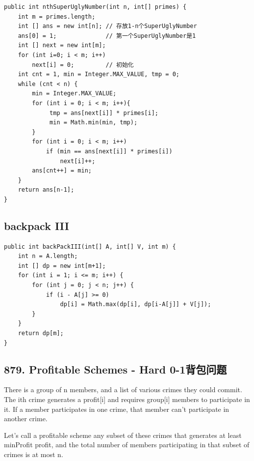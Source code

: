 \documentclass[9pt, b5paaper]{book}
\begin{document}
\begin{verbatim}
public int nthSuperUglyNumber(int n, int[] primes) {
    int m = primes.length;
    int [] ans = new int[n]; // 存放1-n个SuperUglyNumber
    ans[0] = 1;              // 第一个SuperUglyNumber是1
    int [] next = new int[m];
    for (int i=0; i < m; i++)
        next[i] = 0;         // 初始化
    int cnt = 1, min = Integer.MAX_VALUE, tmp = 0;
    while (cnt < n) {
        min = Integer.MAX_VALUE;
        for (int i = 0; i < m; i++){
             tmp = ans[next[i]] * primes[i];
             min = Math.min(min, tmp);
        }
        for (int i = 0; i < m; i++)
            if (min == ans[next[i]] * primes[i])
                next[i]++;
        ans[cnt++] = min;			
    }
    return ans[n-1];		
}
\end{verbatim}

\subsection{backpack III}
\label{sec-1-4-26}
\begin{verbatim}
public int backPackIII(int[] A, int[] V, int m) {
    int n = A.length;
    int [] dp = new int[m+1];
    for (int i = 1; i <= m; i++) {
        for (int j = 0; j < n; j++) {
            if (i - A[j] >= 0)
                dp[i] = Math.max(dp[i], dp[i-A[j]] + V[j]);
        }
    }
    return dp[m];
}
\end{verbatim}

\subsection{879. Profitable Schemes - Hard 0-1背包问题}
\label{sec-1-4-27}
There is a group of n members, and a list of various crimes they could commit. The ith crime generates a profit[i] and requires group[i] members to participate in it. If a member participates in one crime, that member can't participate in another crime.

Let's call a profitable scheme any subset of these crimes that generates at least minProfit profit, and the total number of members participating in that subset of crimes is at most n.
\end{document}
